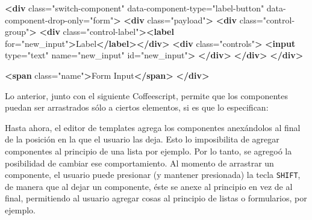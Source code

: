 \documentclass[12pt,spanish,letter]{report}
\newenvironment{Shaded}{}{}
\newcommand{\KeywordTok}[1]{\textcolor[rgb]{0.00,0.44,0.13}{\textbf{{#1}}}}
\newcommand{\CharTok}[1]{\textcolor[rgb]{0.25,0.44,0.63}{{#1}}}
\newcommand{\StringTok}[1]{\textcolor[rgb]{0.25,0.44,0.63}{{#1}}}
\newcommand{\CommentTok}[1]{\textcolor[rgb]{0.38,0.63,0.69}{\textit{{#1}}}}
\newcommand{\OtherTok}[1]{\textcolor[rgb]{0.00,0.44,0.13}{{#1}}}
\newcommand{\FunctionTok}[1]{\textcolor[rgb]{0.02,0.16,0.49}{{#1}}}
\newcommand{\NormalTok}[1]{{#1}}
\begin{document}
\begin{Shaded}
\begin{Highlighting}[]
\KeywordTok{<div}\OtherTok{ class=}\StringTok{"switch-component"}\OtherTok{ data-component-type=}\StringTok{"label-button"} 
\OtherTok{     data-component-drop-only=}\StringTok{"form"}\KeywordTok{>}
  \KeywordTok{<div}\OtherTok{ class=}\StringTok{"payload"}\KeywordTok{>}
    \KeywordTok{<div}\OtherTok{ class=}\StringTok{"control-group"}\KeywordTok{>}
      \KeywordTok{<div}\OtherTok{ class=}\StringTok{"control-label"}\KeywordTok{><label}\OtherTok{ for=}\StringTok{"new_input"}\KeywordTok{>}\NormalTok{Label}\KeywordTok{</label></div>}
      \KeywordTok{<div}\OtherTok{ class=}\StringTok{"controls"}\KeywordTok{>}
        \KeywordTok{<input}\OtherTok{ type=}\StringTok{"text"}\OtherTok{ name=}\StringTok{"new_input"}\OtherTok{ id=}\StringTok{"new_input"}\KeywordTok{>}
      \KeywordTok{</div>}
    \KeywordTok{</div>}
  \KeywordTok{</div>}

  \KeywordTok{<span}\OtherTok{ class=}\StringTok{"name"}\KeywordTok{>}\NormalTok{Form Input}\KeywordTok{</span>}
\KeywordTok{</div>}
\end{Highlighting}
\end{Shaded}

Lo anterior, junto con el siguiente Coffeescript, permite que los
componentes puedan ser arrastrados sólo a ciertos elementos, si es que
lo especifican:

\begin{Shaded}
\end{Shaded}

Hasta ahora, el editor de templates agrega los componentes anexándolos
al final de la posición en la que el usuario las deja. Esto lo
imposibilita de agregar componentes al principio de una lista por
ejemplo. Por lo tanto, se agregoó la posibilidad de cambiar ese
comportamiento. Al momento de arrastrar un componente, el usuario puede
presionar (y mantener presionada) la tecla \texttt{SHIFT}, de manera que
al dejar un componente, éste se anexe al principio en vez de al final,
permitiendo al usuario agregar cosas al principio de listas o
formularios, por ejemplo.
\end{document}
